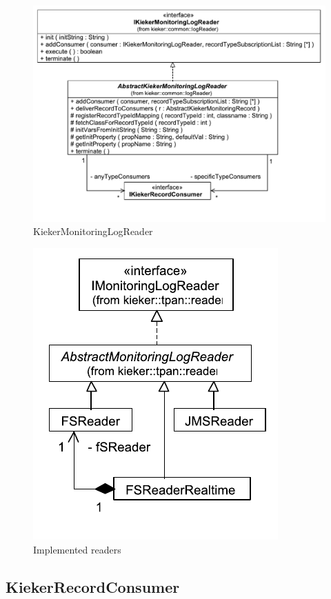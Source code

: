 \documentclass[12pt,journal,a4paper,twocolumn,final,oneside]{IEEEtran}%
\begin{document}
\begin{figure}[h]\centering
\includegraphics[scale=0.65]{figures/model/kieker_KiekerMonitoringLogReader}%
\caption{KiekerMonitoringLogReader}
\end{figure}

\begin{figure}[h]\centering
\includegraphics[scale=0.65]{figures/model/kieker_readerimpls}%
\caption{Implemented readers}
\end{figure}

\subsection{KiekerRecordConsumer}
\end{document}
